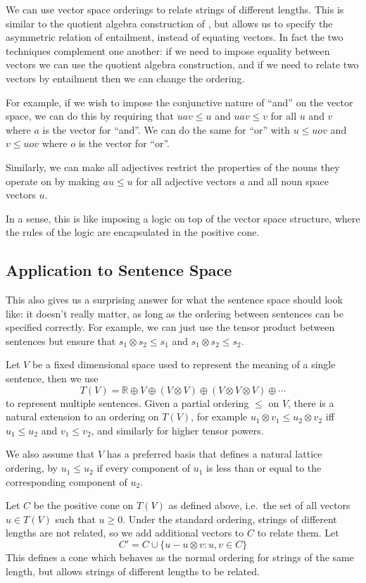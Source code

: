 \documentclass{article}
\begin{document}
We can use vector space orderings to relate strings of different
lengths. This is similar to the quotient algebra construction of
\cite{Clarke:10}, but allows us to specify the asymmetric relation of
entailment, instead of equating vectors. In fact the two techniques
complement one another: if we need to impose equality between vectors
we can use the quotient algebra construction, and if we need to relate
two vectors by entailment then we can change the ordering.

For example, if we wish to impose the conjunctive nature of ``and'' on
the vector space, we can do this by requiring that $uav \le u$ and
$uav \le v$ for all $u$ and $v$ where $a$ is the vector for
``and''. We can do the same for ``or'' with $u \le uov$ and $v\le uov$
where $o$ is the vector for ``or''.

Similarly, we can make all adjectives restrict the properties of the
nouns they operate on by making $au \le u$ for all adjective vectors
$a$ and all noun space vectors $u$.

In a sense, this is like imposing a logic on top of the vector space
structure, where the rules of the logic are encapsulated in the
positive cone.

\subsection{Application to Sentence Space}

This also gives us a surprising answer for what the sentence space
should look like: it doesn't really matter, as long as the ordering
between sentences can be specified correctly. For example, we can just
use the tensor product between sentences but ensure that $s_1\otimes s_2 \le
s_1$ and $s_1\otimes s_2\le s_2$.

Let $V$ be a fixed dimensional space used to represent the meaning of
a single sentence, then we use
$$T(V) = \mathbb{R}\oplus V \oplus (V\otimes V) \oplus (V\otimes V\otimes V) \oplus \cdots$$
to represent multiple sentences. Given a partial ordering $\le$ on
$V$, there is a natural extension to an ordering on $T(V)$, for
example $u_1\otimes v_1 \le u_2\otimes v_2$ iff $u_1 \le u_2$ and
$v_1 \le v_2$, and similarly for higher tensor powers.

We also assume that $V$ has a preferred basis that defines a natural
lattice ordering, by $u_1 \le u_2$ if every component of $u_1$ is less
than or equal to the corresponding component of $u_2$.

Let $C$ be the positive cone on $T(V)$ as defined above, i.e.~the set
of all vectors $u\in T(V)$ such that $u \ge 0$. Under the standard
ordering, strings of different lengths are not related, so we add
additional vectors to $C$ to relate them. Let
$$C' = C \cup \{ u - u\otimes v : u,v \in C \}$$
This defines a cone which behaves as the normal ordering for strings
of the same length, but allows strings of different lengths to be
related.
\end{document}
